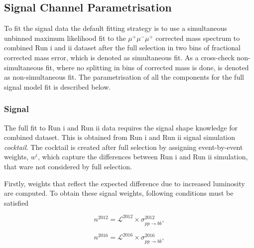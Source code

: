 \subsection{Signal Channel Parametrisation}
\label{sigpara}
To fit the signal data the default fitting strategy is to use a simultaneous unbinned maximum likelihood fit to the $\mu^{+} \mu^{-} \mu^{+}$ corrected mass spectrum to combined Run \Rn{1} and \Rn{2} dataset after the full selection in two bins of fractional corrected mass error, which is denoted as simultaneous fit. As a cross-check non-simultaneous fit, where no splitting in bins of corrected mass is done, is denoted as non-simultaneous fit. The parametrisation of all the components for the full signal model fit is described below.


\subsubsection{Signal}
The full fit to Run \Rn{1} and Run \Rn{2} data requires the signal shape knowledge for combined dataset. This is obtained from Run \Rn{1} and Run \Rn{2} signal simulation \textit{cocktail}. The cocktail is created after full selection by assigning event-by-event weights, \textit{$w^{i}$}, which capture the differences between Run \Rn{1} and Run \Rn{2} simulation, that ware not considered by full selection.

Firstly, weights that reflect the expected difference due to increased luminosity are computed. To obtain these signal weights, following conditions must be satisfied

\begin{equation}
n^{2012}=\mathcal{L}^{2012} \times \sigma^{2012}_{pp \rightarrow b \overline{b}},
\end{equation}

\begin{equation}
n^{2016}=\mathcal{L}^{2016} \times \sigma^{2016}_{pp \rightarrow b \overline{b}},
\end{equation}

